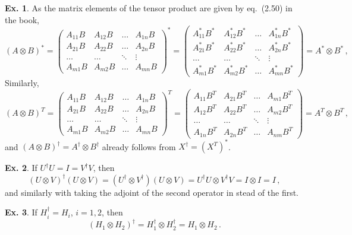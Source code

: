\documentclass[a4paper,12pt]{article}
\theoremstyle{definition}
\newtheorem{exercise}{Ex.}[section]
\begin{document}
\begin{exercise}
 As the matrix elements of the tensor product are given by eq.\ (2.50) in the book,
 \[
  (A\otimes B)^* = \begin{pmatrix} A_{11} B & A_{12} B & \dots & A_{1n} B\\ A_{21} B & A_{22}B & \dots & A_{2n}B \\ \ldots & \ldots & \ddots & \vdots\\ A_{m1}B & A_{m2}B & \dots & A_{mn}B\end{pmatrix}^*
  = \begin{pmatrix} A^*_{11} B^* & A^*_{12} B^* & \dots & A^*_{1n} B^*\\ A^*_{21} B^* & A^*_{22}B^* & \dots & A^*_{2n}B^* \\ \ldots & \ldots & \ddots & \vdots\\ A^*_{m1}B^* & A^*_{m2}B^* & \dots & A^*_{mn}B^*\end{pmatrix} = A^*\otimes B^*\,,
 \]
Similarly,
 \[
  (A\otimes B)^T = \begin{pmatrix} A_{11} B & A_{12} B & \dots & A_{1n} B\\ A_{21} B & A_{22}B & \dots & A_{2n}B \\ \ldots & \ldots & \ddots & \vdots\\ A_{m1}B & A_{m2}B & \dots & A_{mn}B\end{pmatrix}^T
  = \begin{pmatrix} A_{11} B^T & A_{21} B^T & \dots & A_{m1} B^T\\ A_{12} B^T & A_{22}B^T & \dots & A_{m2}B^T \\ \ldots & \ldots & \ddots & \vdots\\ A_{1n}B^T & A_{2n}B^T & \dots & A_{nm}B^T\end{pmatrix} = A^T \otimes B^T\,,
 \]
 and $(A\otimes B)^\dagger = A^\dagger\otimes B^\dagger$ already follows from $X^\dagger=(X^T)^*$.
\end{exercise}

\begin{exercise} If $U^\dagger U=I=V^\dagger V$, then
 \[
  (U\otimes V)^\dagger (U\otimes V) = (U^\dagger\otimes V^\dagger)(U\otimes V) = U^\dagger U \otimes V^\dagger V=I\otimes I = I\,,
 \]
 and similarly with taking the adjoint of the second operator in stead of the first.
\end{exercise}

\begin{exercise} If $H_i^\dagger=H_i$, $i=1,2$, then
 \[
  (H_1\otimes H_2)^\dagger = H_1^\dagger\otimes H_2^\dagger = H_1\otimes H_2\,.
 \]
\end{exercise}
\end{document}
